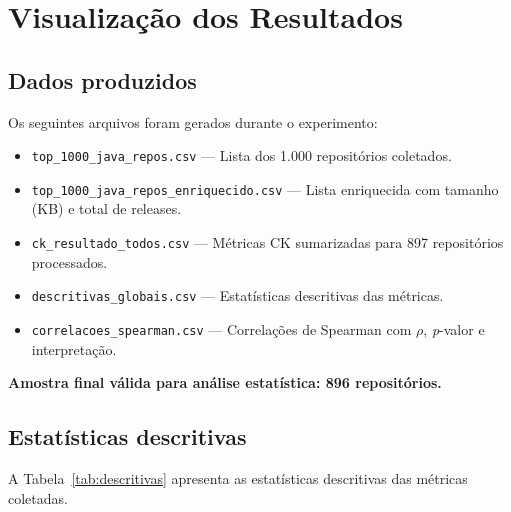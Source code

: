 \documentclass[12pt,a4paper]{article}
\begin{document}
\newpage

\section{Visualização dos Resultados}

\subsection{Dados produzidos}

Os seguintes arquivos foram gerados durante o experimento:

\begin{itemize}
    \item \texttt{top\_1000\_java\_repos.csv} — Lista dos 1.000 repositórios coletados.
    \item \texttt{top\_1000\_java\_repos\_enriquecido.csv} — Lista enriquecida com tamanho (KB) e total de releases.
    \item \texttt{ck\_resultado\_todos.csv} — Métricas CK sumarizadas para 897 repositórios processados.
    \item \texttt{descritivas\_globais.csv} — Estatísticas descritivas das métricas.
    \item \texttt{correlacoes\_spearman.csv} — Correlações de Spearman com $\rho$, \textit{p}-valor e interpretação.
\end{itemize}

\textbf{Amostra final válida para análise estatística: 896 repositórios.}

\subsection{Estatísticas descritivas}

A Tabela~\ref{tab:descritivas} apresenta as estatísticas descritivas das métricas coletadas.
\end{document}
